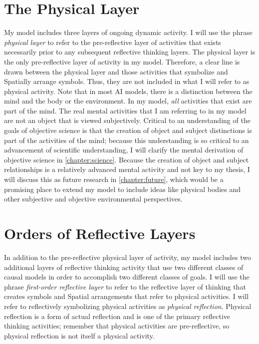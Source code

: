 \section{The Physical Layer}

My model includes three layers of ongoing dynamic activity.  I will
use the phrase \emph{physical layer} to refer to the pre-reflective
layer of activities that exists necessarily prior to any subsequent
reflective thinking layers.  The physical layer is the only
pre-reflective layer of activity in my model.  Therefore, a clear line
is drawn between the physical layer and those activities that
symbolize and Spatially arrange symbols.  Thus, they are not included
in what I will refer to as physical activity.  Note that in most AI
models, there is a distinction between the mind and the body or the
environment.  In my model, \emph{all} activities that exist are part
of the mind.  The real mental activities that I am referring to in my
model are not an object that is viewed subjectively.  Critical to an
understanding of the goals of objective science is that the creation
of object and subject distinctions is part of the activities of the
mind; because this understanding is so critical to an advancement of
scientific understanding, I will clarify the mental derivation of
objective science in \autoref{chapter:science}.  Because the creation
of object and subject relationships is a relatively advanced mental
activity and not key to my thesis, I will discuss this as future
research in \autoref{chapter:future}, which would be a promising place
to extend my model to include ideas like physical bodies and other
subjective and objective environmental perspectives.

\section{Orders of Reflective Layers}

In addition to the pre-reflective physical layer of activity, my model
includes two additional layers of reflective thinking activity that
use two different classes of causal models in order to accomplish two
different classes of goals.  I will use the phrase \emph{first-order
  reflective layer} to refer to the reflective layer of thinking that
creates symbols and Spatial arrangements that refer to physical
activities.  I will refer to reflectively symbolizing physical
activities as \emph{physical reflection}.  Physical reflection is a
form of actual reflection and is one of the primary reflective
thinking activities; remember that physical activities are
pre-reflective, so physical reflection is not itself a physical
activity.

